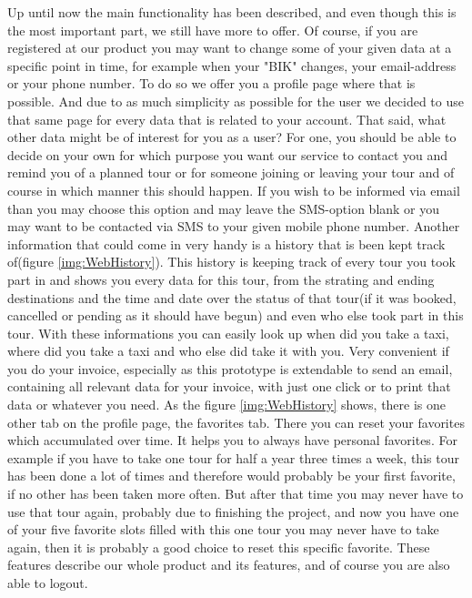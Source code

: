 Up until now the main functionality has been described, and even though this is the most important part, we still have more to
offer.
Of course, if you are registered at our product you may want to change some of your given data at a specific point in time, for
example when your "BIK" changes, your email-address or your phone number. To do so we offer you a profile page where that is
possible. And due to as much simplicity as possible for the user we decided to use that same page for every data that is related
to your account.\newline
That said, what other data might be of interest for you as a user?\newline
\indent For one, you should be able to decide on your own for which purpose you want our service to contact you and remind you of
a planned tour or for someone joining or leaving your tour and of course in which manner this should happen. If you wish to be
informed via email than you may choose this option and may leave the SMS-option blank or you may want to be contacted via SMS to
your given mobile phone number.\newline
\indent Another information that could come in very handy is a history that is been kept track of(figure \ref{img:WebHistory}).
This history is keeping track of every tour you took part in and shows you every data for this tour, from the strating and ending
destinations and the time and date over the status of that tour(if it was booked, cancelled or pending as it should have begun)
and even who else took part in this tour.
With these informations you can easily look up when did you take a taxi, where did you take a taxi and who else did take it with
you. Very convenient if you do your invoice, especially as this prototype is extendable to send an email, containing all relevant
data for your invoice, with just one click or to print that data or whatever you need.
\indent As the figure \ref{img:WebHistory} shows, there is one other tab on the profile page, the favorites tab. There you can
reset your favorites which accumulated over time. It helps you to always have personal favorites. For example if you have to take
one tour for half a year three times a week, this tour has been done a lot of times and therefore would probably be your first
favorite, if no other has been taken more often. But after that time you may never have to use that tour again, probably due to
finishing the project, and now you have one of your five favorite slots filled with this one tour you may never have to take
again, then it is probably a good choice to reset this specific favorite.\newline
\indent These features describe our whole product and its features, and of course you are also able to logout.

